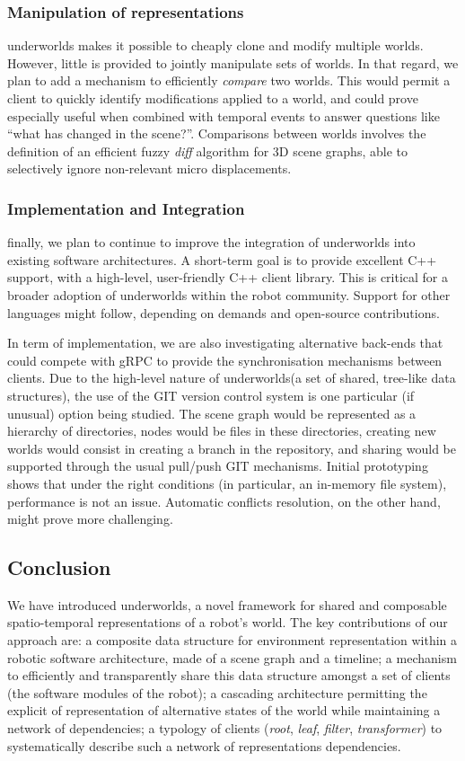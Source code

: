 \documentclass[conference]{IEEEtran}
\newcommand{\uwds}{{\sc underworlds}\xspace}
\begin{document}
\subsubsection{Manipulation of representations} \uwds makes it possible to
cheaply clone and modify multiple worlds. However, little is provided to
jointly manipulate sets of worlds. In that regard, we plan to add a mechanism to
efficiently \emph{compare} two worlds. This would permit a client
to quickly identify modifications applied to a world, and could prove especially
useful when combined with temporal events to answer questions like ``what has
changed in the scene?''. Comparisons between worlds involves the definition of
an efficient fuzzy \emph{diff} algorithm for 3D scene graphs, able to
selectively ignore non-relevant micro displacements.

\subsubsection{Implementation and Integration} finally, we plan to continue to
improve the integration of \uwds into existing software architectures. A
short-term goal is to provide excellent C++ support, with a high-level,
user-friendly C++ client library. This is critical for a broader adoption of \uwds
within the robot community. Support for other languages might follow, depending
on demands and open-source contributions.

In term of implementation, we are also investigating alternative back-ends that
could compete with gRPC to provide the synchronisation mechanisms between
clients. Due to the high-level nature of \uwds (a set of shared, tree-like data
structures), the use of the GIT version control system is one particular (if
unusual) option being studied. The scene graph would be represented as a
hierarchy of directories, nodes would be files in these directories, creating
new worlds would consist in creating a branch in the repository, and sharing
would be supported through the usual pull/push GIT mechanisms. Initial
prototyping shows that under the right conditions (in particular, an in-memory
file system), performance is not an issue. Automatic conflicts resolution, on
the other hand, might prove more challenging.


\subsection{Conclusion}

We have introduced \uwds, a novel framework for shared and composable
spatio-temporal representations of a robot's world. The key contributions of our
approach are: a composite data structure for environment representation within a
robotic software architecture, made of a scene graph and a timeline; a mechanism
to efficiently and transparently share this data structure amongst a set of
clients (the software modules of the robot); a cascading architecture permitting
the explicit of representation of alternative states of the world while
maintaining a network of dependencies; a typology of clients
(\emph{root}, \emph{leaf}, \emph{filter}, \emph{transformer}) to systematically
describe such a network of representations dependencies.
\end{document}
